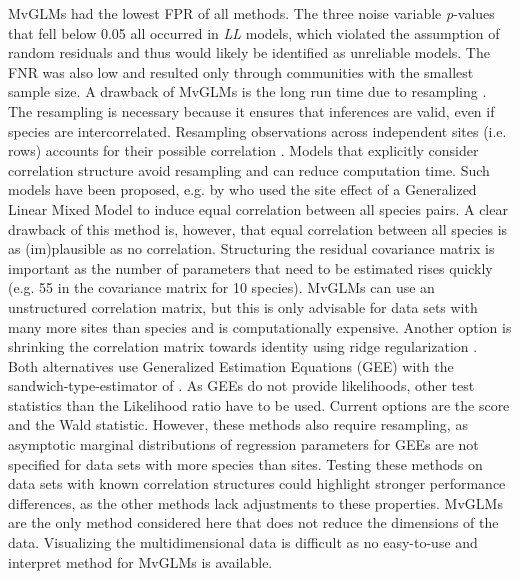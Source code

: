 \documentclass[a4paper,11pt]{article}
\begin{document}
    MvGLMs had the lowest FPR of all methods. 
    The three noise variable \textit{p}-values that fell below 0.05 all occurred in \textit{LL} models, which violated the assumption of random residuals and thus would likely be identified as unreliable models.
	The FNR was also low and resulted only through communities with the smallest sample size.
	A drawback of MvGLMs is the long run time due to resampling \citep{Wang2012}.
	The resampling is necessary because it ensures that inferences are valid, even if species are intercorrelated. 
	Resampling observations across independent sites (i.e. rows) accounts for their possible correlation \citep{anderson2001new}. 
	Models that explicitly consider correlation structure avoid resampling and can reduce computation time.
	Such models have been proposed, e.g. by \citet{Jamil2012} who used the site effect of a Generalized Linear Mixed Model to induce equal correlation between all species pairs.
    A clear drawback of this method is, however, that equal correlation between all species is as (im)plausible as no correlation. 
    Structuring the residual covariance matrix is important as the number of parameters that need to be estimated rises quickly (e.g. 55 in the covariance matrix for 10 species).
    MvGLMs can use an unstructured correlation matrix, but this is only advisable for data sets with many more sites than species and is computationally expensive. 
    Another option is shrinking the correlation matrix towards identity using ridge regularization \citep{warton2008penalized, Warton2011a}.
	Both alternatives use Generalized Estimation Equations (GEE) with the sandwich-type-estimator of \citet{Warton2011a}.
	As GEEs do not provide likelihoods, other test statistics than the Likelihood ratio have to be used. 
	Current options are the score and the Wald statistic.
	However, these methods also require resampling, as asymptotic marginal distributions of regression parameters for GEEs are not specified for data sets with more species than sites.
    Testing these methods on data sets with known correlation structures could highlight stronger performance differences, as the other methods lack adjustments to these properties.
	MvGLMs are the only method considered here that does not reduce the dimensions of the data.
	Visualizing the multidimensional data is difficult as no easy-to-use and interpret method for MvGLMs is available. \\
\end{document}
